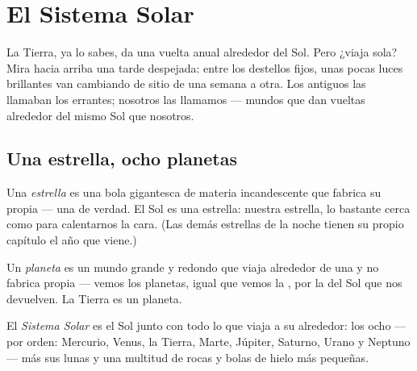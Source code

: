 \chapter{El Sistema Solar}\label{ch:g4:solar-system}

La Tierra, ya lo sabes, da una vuelta anual alrededor del Sol. Pero
¿viaja sola? Mira hacia arriba una tarde despejada: entre los destellos
fijos, unas pocas luces brillantes van cambiando de sitio de una
semana a otra. Los antiguos las llamaban los errantes; nosotros las
llamamos  --- mundos que dan vueltas alrededor del mismo Sol
que nosotros.

\section{Una estrella, ocho planetas}

\begin{definition}[Estrella]\label{def:g4:solar-system:star}
Una \emph{estrella} es una bola gigantesca de materia
incandescente que fabrica su propia  --- una  de
verdad. El Sol es una estrella: nuestra estrella, lo bastante cerca
como para calentarnos la cara. (Las demás estrellas de la noche tienen
su propio capítulo el año que viene.)
\end{definition}

\begin{definition}[Planeta]\label{def:g4:solar-system:planet}
Un \emph{planeta} es un mundo grande y redondo que
viaja alrededor de una  y no fabrica  propia --- vemos
los planetas, igual que vemos la , por la  del Sol que nos
devuelven. La Tierra es un planeta.
\end{definition}

\begin{definition}\label{def:g4:solar-system:family}
El \emph{Sistema Solar} es el Sol junto con todo
lo que viaja a su alrededor: los ocho  --- por orden:
Mercurio, Venus, la Tierra, Marte, Júpiter, Saturno, Urano y Neptuno
--- más sus lunas y una multitud de rocas y bolas de hielo más
pequeñas.
\end{definition}

